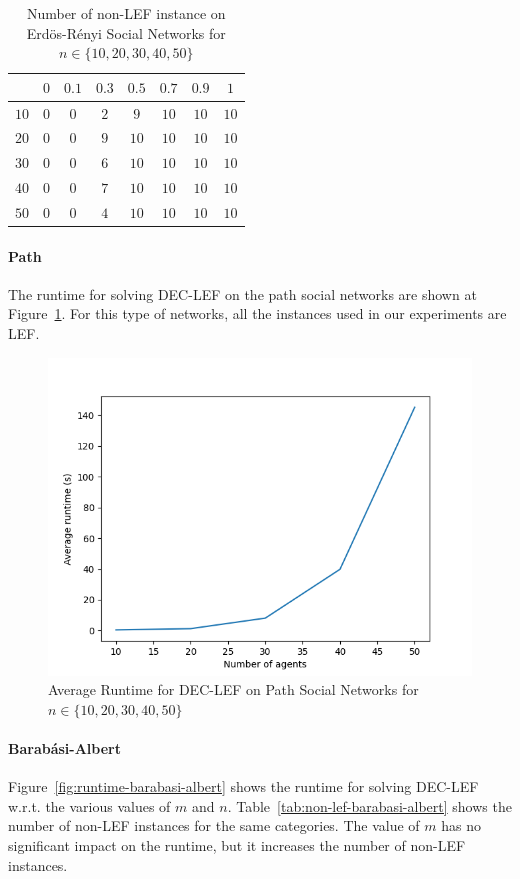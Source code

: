 \documentclass{article}
\begin{document}
\begin{table}[htb]
\centering
\begin{tabular}{|c|c|c|c|c|c|c|c|}
	\hline
	\backslashbox{$n$}{$p$} & $0$ & $0.1$ & $0.3$ & $0.5$ & $0.7$ & $0.9$ & $1$ \\ \hline
	$10$ & $0$ & $0$ & $2$ & $9$ & $10$ & $10$ & $10$ \\
	$20$ & $0$ & $0$ & $9$ & $10$ & $10$ & $10$ & $10$ \\
	$30$ & $0$ & $0$ & $6$ & $10$ & $10$ & $10$ & $10$ \\
	$40$ & $0$ & $0$ & $7$ & $10$ & $10$ & $10$ & $10$ \\
	$50$ & $0$ & $0$ & $4$ & $10$ & $10$ & $10$ & $10$ \\
	\hline
\end{tabular}
\caption{Number of non-LEF instance on Erd\"os-R\'enyi Social Networks for $n \in \{10,20,30,40,50\}$\label{tab:non-lef-erdos-renyi}}
\end{table}

\paragraph{Path} The runtime for solving DEC-LEF on the path social networks are shown at Figure~\ref{fig:runtime-path}. For this type of networks, all the instances used in our experiments are LEF.
\begin{figure}[htb]
\centering
\includegraphics[width=0.5\linewidth]{results-runtime-path.png}
\caption{Average Runtime for DEC-LEF on Path Social Networks for $n \in \{10,20,30,40,50\}$\label{fig:runtime-path}}
\end{figure}

\paragraph{Barab\'asi-Albert} Figure~\ref{fig:runtime-barabasi-albert} shows the runtime for solving DEC-LEF w.r.t. the various values of  $m$ and $n$. Table~\ref{tab:non-lef-barabasi-albert} shows the number of non-LEF instances for the same categories. The value of $m$ has no significant impact on the runtime, but it increases the number of non-LEF instances.
\end{document}

